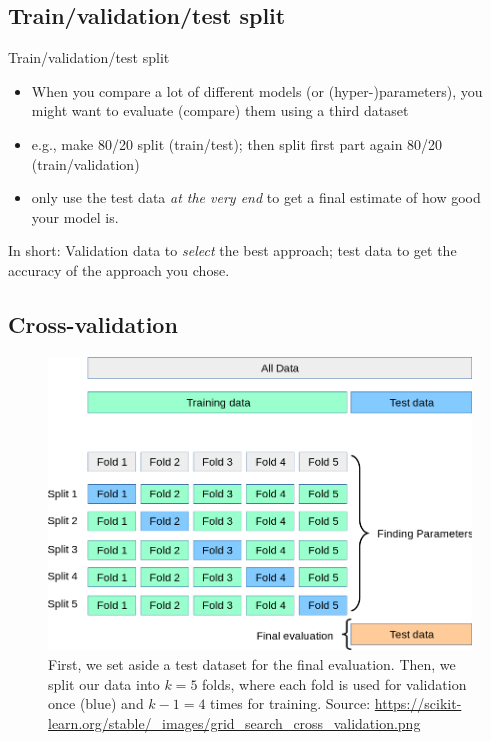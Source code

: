 \documentclass[compress]{beamer}
\begin{document}
\subsection{Train/validation/test split}

\begin{frame}{Train/validation/test split}
\begin{itemize}
	\item When you compare a lot of different models (or (hyper-)parameters), you might want to evaluate (compare) them using a third dataset 
	\item e.g., make 80/20 split (train/test); then split first part again 80/20 (train/validation)
	\item only use the test data \emph{at the very end} to get a final estimate of how good your model is.
\end{itemize}
\pause
In short: Validation data to \emph{select} the best approach; test data to get the accuracy of the approach you chose.
\end{frame}

\subsection{Cross-validation}



\begin{frame}[plain]
	
	\begin{figure}
		\centering
		\includegraphics[width=.8\linewidth]{gridsearchcrossvalidation}
		\caption{First, we set aside a test dataset for the final evaluation. Then, we split our data into $k=5$ folds, where each fold is used for validation once (blue) and $k-1=4$ times for training.
			\tiny Source: \url{https://scikit-learn.org/stable/_images/grid_search_cross_validation.png}}
		\label{fig:crossval}
	\end{figure}
\end{frame}
\end{document}
